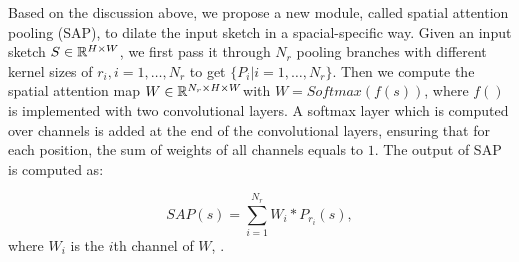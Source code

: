 Based on the discussion above, we propose a new module, called spatial attention pooling (SAP), to dilate the input sketch in a spacial-specific way. 
Given an input sketch $S\in {\mathbb{R}}^{H\times W}$, we first pass it through $N_r$ pooling branches with different kernel sizes of $r_i, i=1,\ldots, N_r$ to get $\{P_{i}| i=1,\ldots,N_r\}$. 
Then we compute the spatial attention map $W\in {\mathbb{R}}^{N_r\times H\times W} $with $W = Softmax(f(s))$, where $f()$ is implemented with two convolutional layers. 
%
A softmax layer which is computed over channels is added at the end of the convolutional layers, ensuring that for each position, the sum of weights of all channels equals to $1$. The output of SAP is computed as:
	
\begin{equation}
	SAP(s)=\sum_{i=1}^{N_r} W_i * P_{r_i}(s),
\end{equation}
%
where $W_i$ is the $i$th channel of $W$, .




